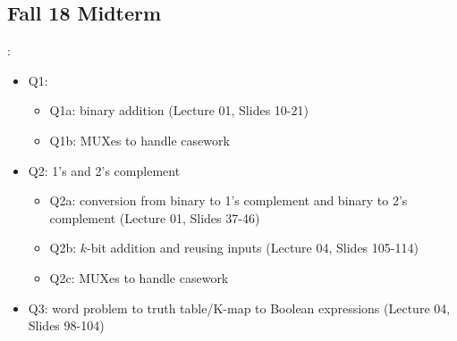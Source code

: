\documentclass{../slides}
\begin{document}
\subsection{Fall 18 Midterm}
\begin{frame}{\secname: \subsecname}
    \begin{itemize}
        \item Q1:
        \begin{itemize}
            \item Q1a: binary addition (Lecture 01, Slides 10-21)
            \item Q1b: MUXes to handle casework
        \end{itemize}
        \item Q2: 1's and 2's complement
        \begin{itemize}
            \item Q2a: conversion from binary to 1's complement and binary to 2's complement (Lecture 01, Slides 37-46)
            \item Q2b: $k$-bit addition and reusing inputs (Lecture 04, Slides 105-114)
            \item Q2c: MUXes to handle casework
        \end{itemize}
        \item Q3: word problem to truth table/K-map to Boolean expressions (Lecture 04, Slides 98-104)
    \end{itemize}
\end{frame}
\end{document}
